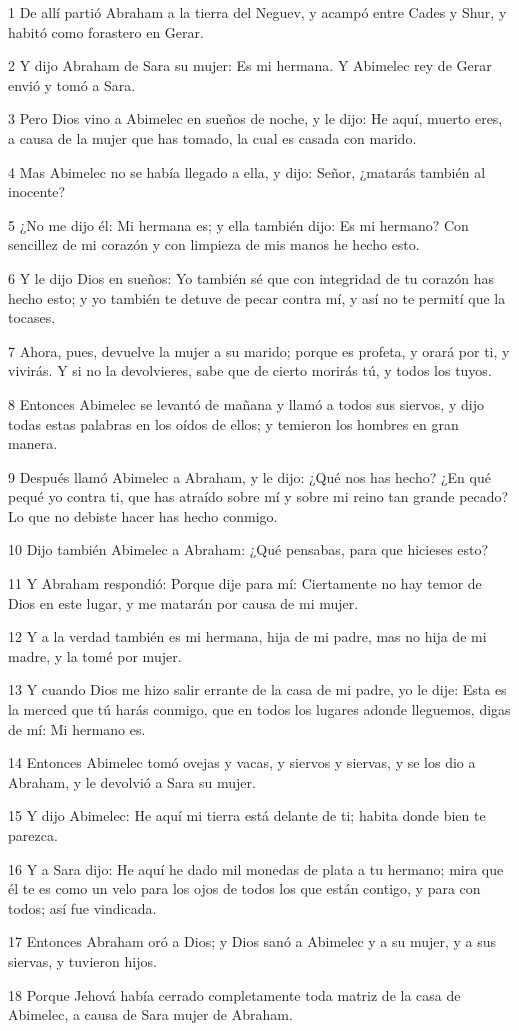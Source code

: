 \par 1 De allí partió Abraham a la tierra del Neguev, y acampó entre Cades y Shur, y habitó como forastero en Gerar.
\par 2 Y dijo Abraham de Sara su mujer: Es mi hermana. Y Abimelec rey de Gerar envió y tomó a Sara.
\par 3 Pero Dios vino a Abimelec en sueños de noche, y le dijo: He aquí, muerto eres, a causa de la mujer que has tomado, la cual es casada con marido.
\par 4 Mas Abimelec no se había llegado a ella, y dijo: Señor, ¿matarás también al inocente?
\par 5 ¿No me dijo él: Mi hermana es; y ella también dijo: Es mi hermano? Con sencillez de mi corazón y con limpieza de mis manos he hecho esto.
\par 6 Y le dijo Dios en sueños: Yo también sé que con integridad de tu corazón has hecho esto; y yo también te detuve de pecar contra mí, y así no te permití que la tocases.
\par 7 Ahora, pues, devuelve la mujer a su marido; porque es profeta, y orará por ti, y vivirás. Y si no la devolvieres, sabe que de cierto morirás tú, y todos los tuyos.
\par 8 Entonces Abimelec se levantó de mañana y llamó a todos sus siervos, y dijo todas estas palabras en los oídos de ellos; y temieron los hombres en gran manera.
\par 9 Después llamó Abimelec a Abraham, y le dijo: ¿Qué nos has hecho? ¿En qué pequé yo contra ti, que has atraído sobre mí y sobre mi reino tan grande pecado? Lo que no debiste hacer has hecho conmigo.
\par 10 Dijo también Abimelec a Abraham: ¿Qué pensabas, para que hicieses esto?
\par 11 Y Abraham respondió: Porque dije para mí: Ciertamente no hay temor de Dios en este lugar, y me matarán por causa de mi mujer.
\par 12 Y a la verdad también es mi hermana, hija de mi padre, mas no hija de mi madre, y la tomé por mujer.
\par 13 Y cuando Dios me hizo salir errante de la casa de mi padre, yo le dije: Esta es la merced que tú harás conmigo, que en todos los lugares adonde lleguemos, digas de mí: Mi hermano es.
\par 14 Entonces Abimelec tomó ovejas y vacas, y siervos y siervas, y se los dio a Abraham, y le devolvió a Sara su mujer.
\par 15 Y dijo Abimelec: He aquí mi tierra está delante de ti; habita donde bien te parezca.
\par 16 Y a Sara dijo: He aquí he dado mil monedas de plata a tu hermano; mira que él te es como un velo para los ojos de todos los que están contigo, y para con todos; así fue vindicada.
\par 17 Entonces Abraham oró a Dios; y Dios sanó a Abimelec y a su mujer, y a sus siervas, y tuvieron hijos.
\par 18 Porque Jehová había cerrado completamente toda matriz de la casa de Abimelec, a causa de Sara mujer de Abraham.

